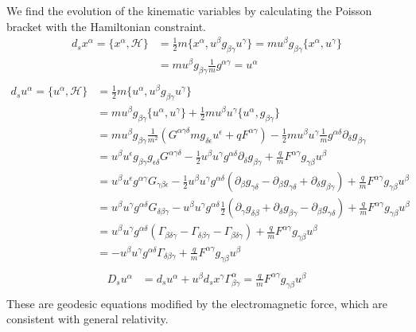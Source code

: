 We find the evolution of the kinematic variables by calculating the Poisson bracket with the Hamiltonian constraint.
\begingroup
\allowdisplaybreaks
\begin{equation}
	\begin{aligned}
		d_s x^\alpha = \{x^\alpha, \mathcal{H}\} &= \frac{1}{2} m  \{x^\alpha, u^\beta g_{\beta\gamma} u^\gamma\} = m u^\beta g_{\beta \gamma} \{x^\alpha, u^\gamma\}\\
		&= m u^\beta g_{\beta\gamma} \frac{1}{m} g^{\alpha\gamma} = u^\alpha \\
	\end{aligned}
\end{equation}
	\begin{align*}
		d_s u^\alpha = \{ u^\alpha , \mathcal{H} \} &= \frac{1}{2} m \{u^\alpha, u^\beta g_{\beta\gamma} u^\gamma\} \\
		&=  m u^\beta g_{\beta\gamma} \{u^\alpha,  u^\gamma\} + \frac{1}{2} m u^\beta u^\gamma \{u^\alpha,  g_{\beta\gamma} \} \\
		&= m u^\beta g_{\beta\gamma} \frac{1}{m^2} (G^{\alpha \gamma \delta} m g_{\delta \epsilon} u^\epsilon +  q F^{\alpha \gamma}) - \frac{1}{2} m u^\beta u^\gamma \frac{1}{m} g^{\alpha \delta} \partial_\delta g_{\beta\gamma} \\
		&= u^\beta u^\epsilon g_{\beta\gamma} g_{\epsilon \delta} G^{\alpha \gamma \delta} - \frac{1}{2} u^\beta u^\gamma g^{\alpha \delta} \partial_\delta g_{\beta\gamma} + \frac{q}{m} F^{\alpha \gamma}g_{\gamma\beta}u^\beta \\
		&= u^\beta u^\epsilon g^{\alpha\gamma} G_{\gamma \beta \epsilon} - \frac{1}{2} u^\beta u^\gamma g^{\alpha \delta} (\partial_\beta g_{\gamma\delta} - \partial_\beta g_{\gamma\delta} + \partial_\delta g_{\beta\gamma}) + \frac{q}{m} F^{\alpha \gamma}g_{\gamma\beta}u^\beta \\
		&= u^\beta u^\gamma g^{\alpha\delta} G_{\delta \beta \gamma} -  u^\beta u^\gamma g^{\alpha \delta} \frac{1}{2} (\partial_\gamma g_{\delta\beta} + \partial_\delta g_{\beta\gamma} - \partial_\beta g_{\gamma\delta}) + \frac{q}{m} F^{\alpha \gamma}g_{\gamma\beta}u^\beta \\
		&= u^\beta u^\gamma g^{\alpha\delta} (\Gamma_{\beta \delta \gamma} - \Gamma_{\delta \beta \gamma} - \Gamma_{\beta \delta \gamma}) + \frac{q}{m} F^{\alpha \gamma}g_{\gamma\beta}u^\beta \\
		&= - u^\beta u^\gamma g^{\alpha\delta} \Gamma_{\delta \beta \gamma} + \frac{q}{m} F^{\alpha \gamma}g_{\gamma\beta}u^\beta \\
	\end{align*}
\begin{equation}
	\begin{aligned}
		D_s u^\alpha &= d_s u^\alpha + u^\beta d_sx^\gamma \Gamma^\alpha_{\beta\gamma} = \frac{q}{m} F^{\alpha \gamma}g_{\gamma\beta}u^\beta \\
	\end{aligned}
\end{equation}
\endgroup
These are geodesic equations modified by the electromagnetic force, which are consistent with general relativity.

